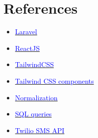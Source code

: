 \documentclass{article}
\begin{document}
\section{References}
\begin{itemize}
    \item \href{https://laravel.com/docs/8.x}{\textcolor{blue}{Laravel}}
    \item \href{https://reactjs.org/docs/getting-started.html}{\textcolor{blue}{ReactJS}}
    \item \href{https://tailwindcss.com/docs}{\textcolor{blue}{TailwindCSS}}
    \item \href{https://tailwindui.com/}{\textcolor{blue}{Tailwind CSS components}}
    \item \href{https://opentextbc.ca/dbdesign01/chapter/chapter-12-normalization/}{\textcolor{blue}{Normalization}}
    \item \href{https://www.w3schools.com/sql/}{\textcolor{blue}{SQL queries}}
    \item \href{https://www.twilio.com/docs/sms}{\textcolor{blue}{Twilio SMS API}}
\end{itemize}
\end{document}
